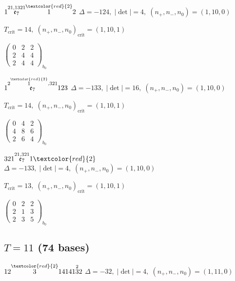 \documentclass[10pt]{article}
\begin{document}
\smallskip

$1\overset{21,1321}{\mathfrak{e}_7}\overset{\textcolor{red}{2}}{1}2$ \quad $\Delta=-124,\; |\det|=4,\; (n_+,n_-,n_0)=(1,10,0)$

\hspace{1em}$T_{\text{crit}}=14,\; (n_+,n_-,n_0)_{\text{crit}}=(1,10,1)$

\hspace{2em}$\left(\begin{smallmatrix}0 & 2 & 2 \\ 2 & 4 & 4 \\ 2 & 4 & 4\end{smallmatrix}\right)_{\!b_0}$

\smallskip

$1\overset{2\overset{\textcolor{red}{2}}{1},321}{\mathfrak{e}_7}123$ \quad $\Delta=-133,\; |\det|=16,\; (n_+,n_-,n_0)=(1,10,0)$

\hspace{1em}$T_{\text{crit}}=14,\; (n_+,n_-,n_0)_{\text{crit}}=(1,10,1)$

\hspace{2em}$\left(\begin{smallmatrix}0 & 4 & 2 \\ 4 & 8 & 6 \\ 2 & 6 & 4\end{smallmatrix}\right)_{\!b_0}$

$321\overset{21,321}{\mathfrak{e}_7}1\textcolor{red}{2}$ \quad $\Delta=-133,\; |\det|=4,\; (n_+,n_-,n_0)=(1,10,0)$

\hspace{1em}$T_{\text{crit}}=13,\; (n_+,n_-,n_0)_{\text{crit}}=(1,10,1)$

\hspace{2em}$\left(\begin{smallmatrix}0 & 2 & 2 \\ 2 & 1 & 3 \\ 2 & 3 & 5\end{smallmatrix}\right)_{\!b_0}$


\subsection*{$T = 11$ \quad (74 bases)}
\smallskip

$12\overset{\textcolor{red}{2}}{3}14141\overset{2}{3}2$ \quad $\Delta=-32,\; |\det|=4,\; (n_+,n_-,n_0)=(1,11,0)$
\end{document}
